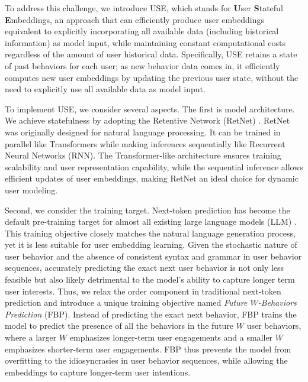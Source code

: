 \documentclass{article}
\begin{document}
To address this challenge, we introduce USE, which stands for \textbf{U}ser \textbf{S}tateful \textbf{E}mbeddings, an approach that can efficiently produce user embeddings equivalent to explicitly incorporating all available data (including historical information) as model input, while maintaining constant computational costs regardless of the amount of user historical data.
Specifically, USE retains a state of past behaviors for each user; as new behavior data comes in, it efficiently computes new user embeddings by updating the previous user state, without the need to explicitly use all available data as model input.

To implement USE, we consider several aspects. The first is model architecture. We achieve statefulness by adopting the Retentive Network (RetNet) \citep{retnet}. RetNet was originally designed for natural language processing. It can be trained in parallel like Transformers while making inferences sequentially like Recurrent Neural Networks (RNN). The Transformer-like architecture ensures training scalability and user representation capability, while the sequential inference allows efficient updates of user embeddings, making RetNet an ideal choice for dynamic user modeling.

Second, we consider the training target. Next-token prediction has become the default pre-training target for almost all existing large language models (LLM) \citep{gpt2, retnet}. This training objective closely matches the natural language generation process, yet it is less suitable for user embedding learning. Given the stochastic nature of user behavior and the absence of consistent syntax and grammar in user behavior sequences, accurately predicting the exact next user behavior is not only less feasible but also likely detrimental to the model's ability to capture longer term user interests. 
Thus, we relax the order component in traditional next-token prediction and introduce a unique training objective named \textit{Future $W$-Behaviors Prediction} (FBP). 
Instead of predicting the exact next behavior, FBP trains the model to predict the presence of all the behaviors in the future $W$ user behaviors, where a larger $W$ emphasizes longer-term user engagements and a smaller $W$ emphasizes shorter-term user engagements. 
FBP thus prevents the model from overfitting to the idiosyncrasies in user behavior sequences, while allowing the embeddings to capture longer-term user intentions.
\end{document}
